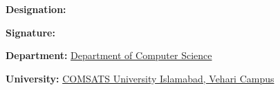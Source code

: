\vspace{0.5cm}

\noindent
\textbf{Designation:} \underline{\hspace{6cm}}  

\vspace{0.5cm}

\noindent
\textbf{Signature:} \underline{\hspace{6cm}}  

\vspace{0.5cm}

\noindent
\textbf{Department:} \underline{Department of Computer Science}  

\vspace{0.5cm}

\noindent
\textbf{University:} \underline{COMSATS University Islamabad, Vehari Campus}

\newpage

